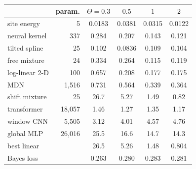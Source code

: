 \begin{tabular}{@{}lrcccc@{}}
\toprule
 & param. & $\Theta=0.3$ & $0.5$ & $1$ & $2$\\
\midrule
site energy & 5 & 0.0183 & 0.0381 & 0.0315 & 0.0122\\
neural kernel & 337 & 0.284 & 0.207 & 0.143 & 0.121\\
tilted spline & 25 & 0.102 & 0.0836 & 0.109 & 0.104\\
free mixture & 24 & 0.334 & 0.264 & 0.115 & 0.119\\
log-linear 2-D & 100 & 0.657 & 0.208 & 0.177 & 0.175\\
MDN & 1{,}516 & 0.731 & 0.564 & 0.339 & 0.364\\
shift mixture & 25 & 26.7 & 5.27 & 1.49 & 0.82\\
\midrule
transformer & 18{,}057 & 1.46 & 1.27 & 1.35 & 1.17\\
window CNN & 5{,}505 & 3.12 & 4.01 & 4.57 & 4.76\\
global MLP & 26{,}016 & 25.5 & 16.6 & 14.7 & 14.3\\
\midrule
best linear &  & 26.5 & 5.26 & 1.48 & 0.804\\
\midrule
Bayes loss & & 0.263 & 0.280 & 0.283 & 0.281\\
\bottomrule
\end{tabular}
